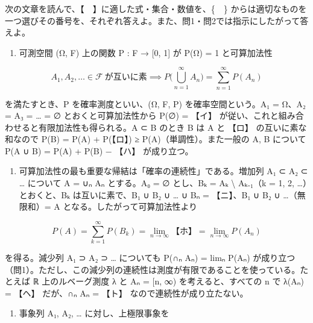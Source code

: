 \documentclass[
  10pt,
  a4paper,
]{article}
\providecommand{\tightlist}{%
  \setlength{\itemsep}{0pt}\setlength{\parskip}{0pt}}
\begin{document}
次の文章を読んで、【　】に適した式・集合・数値を、\{　\}
からは適切なものを一つ選びその番号を、それぞれ答えよ。また、問1・問2では指示にしたがって答えよ。

\begin{enumerate}
\def\labelenumi{(\arabic{enumi})}
\tightlist
\item
  可測空間 (Ω, F) 上の関数 P : F → {[}0, 1{]} が P(Ω) = 1 と可算加法性
\end{enumerate}

\[A_1, A_2, \ldots \in \mathcal{F}\ \text{が互いに素} \implies P\Big(\bigcup_{n=1}^{\infty} A_n\Big) = \sum_{n=1}^{\infty} P(A_n)\]

を満たすとき、P を確率測度といい、(Ω, F, P)
を確率空間という。A{\fallbackfont ₁} = Ω、A{\fallbackfont ₂} =
A{\fallbackfont ₃} = \ldots{} = ∅ とおくと可算加法性から P(∅) = 【イ】
が従い、これと組み合わせると有限加法性も得られる。A ⊂ B のとき B は A と
【ロ】 の互いに素な和なので P(B) = P(A) + P(【ロ】) ≥
P(A)（単調性）。また一般の A, B について P(A ∪ B) = P(A) + P(B) − 【ハ】
が成り立つ。

\begin{enumerate}
\def\labelenumi{(\arabic{enumi})}
\setcounter{enumi}{1}
\tightlist
\item
  可算加法性の最も重要な帰結は「確率の連続性」である。増加列
  A{\fallbackfont ₁} ⊂ A{\fallbackfont ₂} ⊂ \ldots{} について A =
  ∪{\fallbackfont ₙ} A{\fallbackfont ₙ} とする。A{\fallbackfont ₀} = ∅
  とし、B{\fallbackfont ₖ} = A{\fallbackfont ₖ} \textbackslash{}
  A{\fallbackfont ₖ₋₁}（k = 1, 2, \ldots）とおくと、B{\fallbackfont ₖ}
  は互いに素で、B{\fallbackfont ₁} ∪ B{\fallbackfont ₂} ∪ \ldots{} ∪
  B{\fallbackfont ₙ} = 【ニ】、B{\fallbackfont ₁} ∪ B{\fallbackfont ₂} ∪
  \ldots（無限和）= A となる。したがって可算加法性より
\end{enumerate}

\[P(A) = \sum_{k=1}^{\infty} P(B_k) = \lim_{n\to\infty} \text{【ホ】} = \lim_{n\to\infty} P(A_n)\]

を得る。減少列 A{\fallbackfont ₁} ⊃ A{\fallbackfont ₂} ⊃ \ldots{}
についても P(∩{\fallbackfont ₙ} A{\fallbackfont ₙ}) =
lim{\fallbackfont ₙ} P(A{\fallbackfont ₙ})
が成り立つ（問1）。ただし、この減少列の連続性は測度が有限であることを使っている。たとえば
{\fallbackfont ℝ} 上のルベーグ測度 λ と A{\fallbackfont ₙ} = {[}n, ∞)
を考えると、すべての n で λ(A{\fallbackfont ₙ}) = 【ヘ】
だが、∩{\fallbackfont ₙ} A{\fallbackfont ₙ} = 【ト】
なので連続性が成り立たない。

\begin{enumerate}
\def\labelenumi{(\arabic{enumi})}
\setcounter{enumi}{2}
\tightlist
\item
  事象列 A{\fallbackfont ₁}, A{\fallbackfont ₂}, \ldots{}
  に対し、上極限事象を
\end{enumerate}
\end{document}

